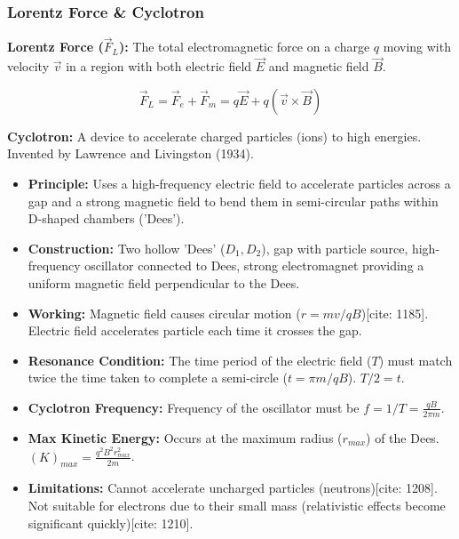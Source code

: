 \transfade[duration=0.5]

\begin{frame}[t]
    \frametitle{\textcolor{deepnavy}{\textbf{Lorentz Force & Cyclotron}}}
    \renewcommand{\familydefault}{\rmdefault}
    \small

      \item<+-> \textbf{Lorentz Force ($\vec{F}_L$):} The total electromagnetic force on a charge $q$ moving with velocity $\vec{v}$ in a region with both electric field $\vec{E}$ and magnetic field $\vec{B}$.
        \begin{tcolorbox}[colback=orange!8,colframe=accentorange,boxrule=0.5pt,arc=1mm,boxsep=2pt]
        \begin{equation*}
             \vec{F}_L = \vec{F}_e + \vec{F}_m = q\vec{E} + q(\vec{v} \times \vec{B})
        \end{equation*}
          \end{tcolorbox}

    \vspace{0.5em}

      \item<+-> \textbf{Cyclotron:} A device to accelerate charged particles (ions) to high energies.   Invented by Lawrence and Livingston (1934).
        \begin{itemize}[<+->]
              \item \textbf{Principle:} Uses a high-frequency electric field to accelerate particles across a gap and a strong magnetic field to bend them in semi-circular paths within D-shaped chambers ('Dees').
              \item \textbf{Construction:} Two hollow 'Dees' ($D_1, D_2$), gap with particle source, high-frequency oscillator connected to Dees, strong electromagnet providing a uniform magnetic field perpendicular to the Dees.
              \item \textbf{Working:} Magnetic field causes circular motion ($r=mv/qB$)[cite: 1185].   Electric field accelerates particle each time it crosses the gap.
            \item \textbf{Resonance Condition:} The time period of the electric field ($T$) must match twice the time taken to complete a semi-circle ($t = \pi m / qB$).   $T/2 = t$.
              \item \textbf{Cyclotron Frequency:} Frequency of the oscillator must be $f = 1/T = \frac{qB}{2\pi m}$.
            \item \textbf{Max Kinetic Energy:} Occurs at the maximum radius ($r_{max}$) of the Dees.   $(K)_{max} = \frac{q^2 B^2 r_{max}^2}{2m}$.
              \item \textbf{Limitations:} Cannot accelerate uncharged particles (neutrons)[cite: 1208].   Not suitable for electrons due to their small mass (relativistic effects become significant quickly)[cite: 1210].
        \end{itemize}
\end{frame}

